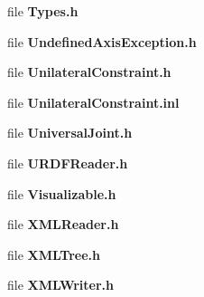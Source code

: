 \begin{DoxyCompactItemize}
file {\bfseries Types.\-h}
\item 
file {\bfseries Undefined\-Axis\-Exception.\-h}
\item 
file {\bfseries Unilateral\-Constraint.\-h}
\item 
file {\bfseries Unilateral\-Constraint.\-inl}
\item 
file {\bfseries Universal\-Joint.\-h}
\item 
file {\bfseries U\-R\-D\-F\-Reader.\-h}
\item 
file {\bfseries Visualizable.\-h}
\item 
file {\bfseries X\-M\-L\-Reader.\-h}
\item 
file {\bfseries X\-M\-L\-Tree.\-h}
\item 
file {\bfseries X\-M\-L\-Writer.\-h}
\end{DoxyCompactItemize}
